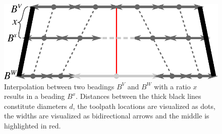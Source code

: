 \begin{figure}
\centering
\includegraphics[width=.8\columnwidth]{sources/method/beading_interpolation_v2.pdf}
\caption{
Interpolation between two beadings $B^V$ and $B^W$ with a ratio $x$ results in a beading $B^x$.
Distances between the thick black lines constitute diameters $d$,
the toolpath locations are visualized as dots,
the widths are visualized as bidirectional arrows
and the middle is highlighted in red.
}
\label{beading_interpolation}
\end{figure}


